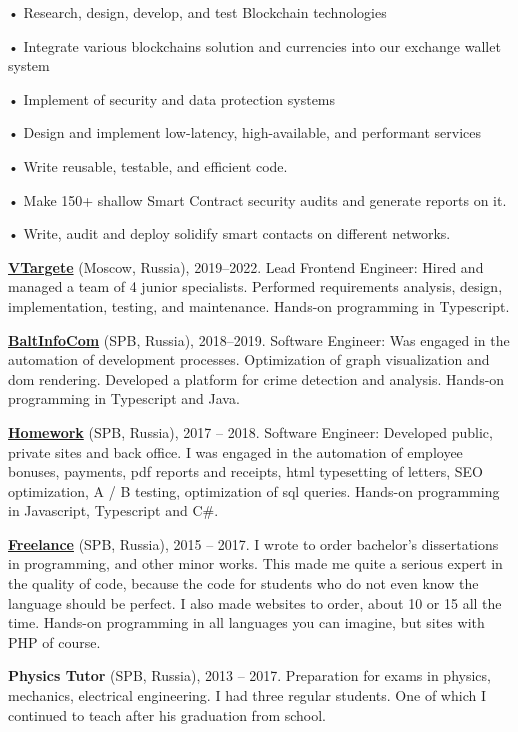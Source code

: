 \documentclass{yb}
\begin{document}
• Research, design, develop, and test Blockchain technologies

• Integrate various blockchains solution and currencies into our exchange wallet system

• Implement of security and data protection systems

• Design and implement low-latency, high-available, and performant services

• Write reusable, testable, and efficient code.

• Make 150+ shallow Smart Contract security audits and generate reports on it.

• Write, audit and deploy solidify smart contacts on different networks.


\href{https://vtargete.ru/}{\textbf{VTargete}} (Moscow, Russia), 2019--2022.
Lead Frontend Engineer: 
Hired and managed a team of 4 junior specialists.
Performed requirements analysis, design, implementation, testing, and maintenance.
Hands-on programming in Typescript.

\textbf{\href{https://baltinfocom.ru/BigData\#en}{BaltInfoCom}} (SPB, Russia), 2018--2019.
Software Engineer:
Was engaged in the automation of development processes. Optimization of graph visualization and dom rendering. Developed a platform for crime detection and analysis.
Hands-on programming in Typescript and Java.

\textbf{\href{https://homework.ru}{Homework}} (SPB, Russia), 2017 -- 2018.
Software Engineer:
Developed public, private sites and back office. I was engaged in the automation of employee bonuses, payments, pdf reports and receipts, html typesetting of letters, SEO optimization, A / B testing, optimization of sql queries.
Hands-on programming in Javascript, Typescript and C\#.

\textbf{\href{https://www.upwork.com/}{Freelance}} (SPB, Russia), 2015 -- 2017.
I wrote to order bachelor's dissertations in programming, and other minor works. This made me quite a serious expert in the quality of code, because the code for students who do not even know the language should be perfect. I also made websites to order, about 10 or 15 all the time. 
Hands-on programming in all languages you can imagine, but sites with PHP of course.

\textbf{Physics Tutor} (SPB, Russia), 2013 -- 2017.
Preparation for exams in physics, mechanics, electrical engineering.
I had three regular students. One of which I continued to teach after his graduation from school.
\end{document}
